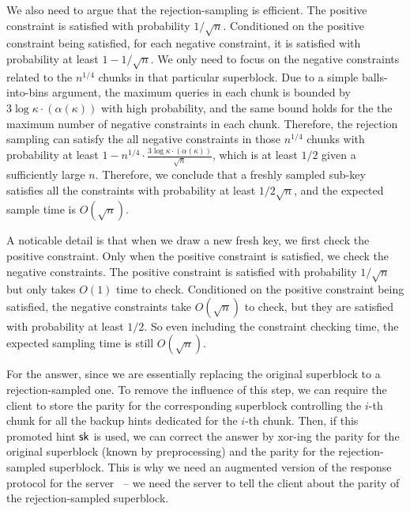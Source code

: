 \begin{enumerate}
    We also need to argue that the rejection-sampling is efficient. The positive
    constraint is satisfied with probability $1/\sqrt{n}$. Conditioned on the
    positive constraint being satisfied, for each negative constraint, it is
    satisfied with probability at least $1-1/\sqrt{n}$. We only need to focus on 
    the negative constraints related to the $n^{1/4}$ chunks in that particular 
    superblock. Due to a simple balls-into-bins argument, the maximum queries in
    each chunk is bounded by $3\log\kappa\cdot(\alpha(\kappa))$ with high probability, 
    and the same bound holds for the
    the maximum number of negative constraints in each chunk.
    Therefore, the rejection sampling can satisfy the all negative constraints
    in those $n^{1/4}$ chunks with probability at least $1-n^{1/4}\cdot\frac{3\log\kappa\cdot(\alpha(\kappa))}{\sqrt{n}}$,
    which is at least $1/2$ given a sufficiently large $n$. Therefore, we conclude
    that a freshly sampled sub-key satisfies all the constraints with
    probability at least $1/2\sqrt{n}$, and the expected sample time is
    $O(\sqrt{n})$. 
    
    A noticable detail is that when we draw a new fresh key,
    we first check the positive constraint. Only when the positive constraint is
    satisfied, we check the negative constraints. The positive constraint is
    satisfied with probability $1/\sqrt{n}$ but only takes $O(1)$ time to check.
    Conditioned on the positive constraint being satisfied, the negative
    constraints take $O(\sqrt{n})$ to check, but they are satisfied with probability
    at least $1/2$. So even including the constraint checking time, the expected
    sampling time is still $O(\sqrt{n})$.
    
    For the answer, since we are essentially replacing the original superblock
    to a rejection-sampled one. To remove the influence of this step, we can
    require the client to store the parity for the corresponding superblock
    controlling the $i$-th chunk for all the backup hints dedicated for the
    $i$-th chunk. Then, if this promoted hint $\mathsf{sk}$ is used, we can correct the
    answer by xor-ing the parity for the original superblock (known by preprocessing) and the parity for the
    rejection-sampled superblock.
    This is why we need an augmented version of the response protocol for the server~ -- we need the server to tell the client about the parity of the rejection-sampled superblock.
    
\end{enumerate}


